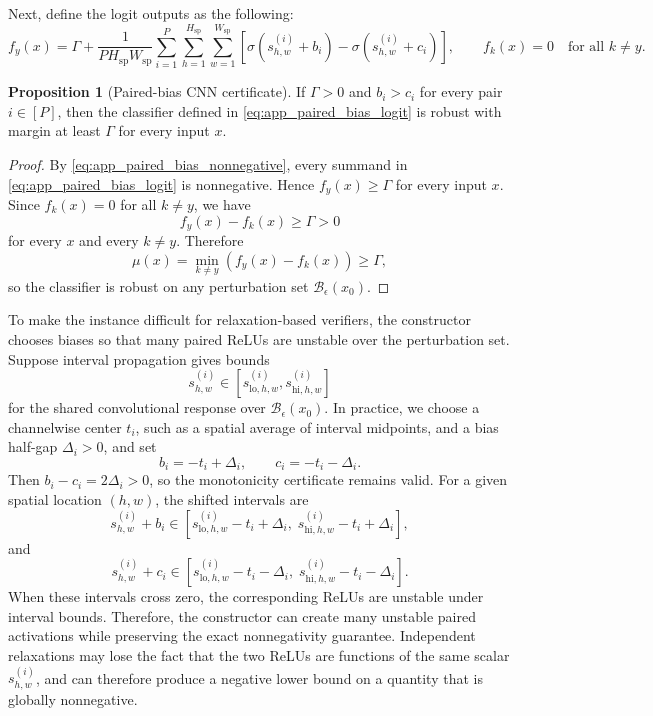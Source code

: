 \documentclass{article}
\theoremstyle{definition}
\newtheorem{proposition}[theorem]{Proposition}
\begin{document}
Next, define the logit outputs as the following:
\begin{equation}
    f_y(x)
    =
    \Gamma+
    \frac{1}{P H_{\mathrm{sp}} W_{\mathrm{sp}}}
    \sum_{i=1}^{P}
    \sum_{h=1}^{H_{\mathrm{sp}}}
    \sum_{w=1}^{W_{\mathrm{sp}}}
    \left[
        \sigma(s_{h,w}^{(i)}+b_i)-\sigma(s_{h,w}^{(i)}+c_i)
    \right],
    \qquad
    f_k(x)=0\quad \text{for all }k\neq y.
    \label{eq:app_paired_bias_logit}
\end{equation}

\begin{proposition}[Paired-bias CNN certificate]
If $\Gamma>0$ and $b_i>c_i$ for every pair $i\in[P]$, then the classifier defined in \eqref{eq:app_paired_bias_logit} is robust with margin at least $\Gamma$ for every input $x$.
\end{proposition}

\begin{proof}
By \eqref{eq:app_paired_bias_nonnegative}, every summand in \eqref{eq:app_paired_bias_logit} is nonnegative. Hence $f_y(x)\geq \Gamma$ for every input $x$. Since $f_k(x)=0$ for all $k\neq y$, we have
\[
    f_y(x)-f_k(x)\geq \Gamma>0
\]
for every $x$ and every $k\neq y$. Therefore
\[
    \mu(x)=\min_{k\neq y}(f_y(x)-f_k(x))\geq \Gamma,
\]
so the classifier is robust on any perturbation set $\mathcal B_\epsilon(x_0)$.
\end{proof}

To make the instance difficult for relaxation-based verifiers, the constructor chooses biases so that many paired ReLUs are unstable over the perturbation set. Suppose interval propagation gives bounds
\[
    s_{h,w}^{(i)}\in
    [s_{\mathrm{lo},h,w}^{(i)},s_{\mathrm{hi},h,w}^{(i)}]
\]
for the shared convolutional response over $\mathcal B_\epsilon(x_0)$. In practice, we choose a channelwise center $t_i$, such as a spatial average of interval midpoints, and a bias half-gap $\Delta_i>0$, and set
\begin{equation}
    b_i=-t_i+\Delta_i,
    \qquad
    c_i=-t_i-\Delta_i.
    \label{eq:app_paired_bias_biases}
\end{equation}
Then $b_i-c_i=2\Delta_i>0$, so the monotonicity certificate remains valid. For a given spatial location $(h,w)$, the shifted intervals are
\begin{equation}
    s_{h,w}^{(i)}+b_i
    \in
    [s_{\mathrm{lo},h,w}^{(i)}-t_i+\Delta_i,\;
     s_{\mathrm{hi},h,w}^{(i)}-t_i+\Delta_i],
\end{equation}
and
\begin{equation}
    s_{h,w}^{(i)}+c_i
    \in
    [s_{\mathrm{lo},h,w}^{(i)}-t_i-\Delta_i,\;
     s_{\mathrm{hi},h,w}^{(i)}-t_i-\Delta_i].
    \label{eq:app_paired_bias_intervals}
\end{equation}
When these intervals cross zero, the corresponding ReLUs are unstable under interval bounds. Therefore, the constructor can create many unstable paired activations while preserving the exact nonnegativity guarantee. Independent relaxations may lose the fact that the two ReLUs are functions of the same scalar $s_{h,w}^{(i)}$, and can therefore produce a negative lower bound on a quantity that is globally nonnegative.
\end{document}
